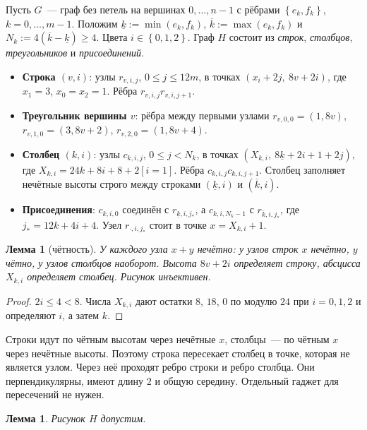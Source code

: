 \documentclass[a4paper,11pt]{article}
\theoremstyle{plain}
\newtheorem{lemma}[theorem]{Лемма}
\theoremstyle{definition}
\theoremstyle{remark}
\newcommand{\set}[1]{\left\{ #1 \right\}}
\begin{document}
Пусть $G$~--- граф без петель на вершинах $0,\dots,n-1$ с рёбрами $\set{e_k,f_k}$, $k=0,\dots,m-1$. Положим $\underline k:=\min(e_k,f_k)$, $\overline k:=\max(e_k,f_k)$ и $N_k:=4(\overline k-\underline k)\ge4$. Цвета $i\in\set{0,1,2}$. Граф $H$ состоит из \emph{строк}, \emph{столбцов}, \emph{треугольников} и \emph{присоединений}.

\begin{itemize}
    \item \textbf{Строка $(v,i)$}: узлы $r_{v,i,j}$, $0\le j\le12m$, в точках $(x_i+2j,\ 8v+2i)$, где $x_1=3$, $x_0=x_2=1$. Рёбра $r_{v,i,j}r_{v,i,j+1}$.
    \item \textbf{Треугольник вершины $v$}: рёбра между первыми узлами $r_{v,0,0}=(1,8v)$, $r_{v,1,0}=(3,8v+2)$, $r_{v,2,0}=(1,8v+4)$.
    \item \textbf{Столбец $(k,i)$}: узлы $c_{k,i,j}$, $0\le j<N_k$, в точках $(X_{k,i},\ 8\underline k+2i+1+2j)$, где $X_{k,i}=24k+8i+8+2[i=1]$. Рёбра $c_{k,i,j}c_{k,i,j+1}$. Столбец заполняет нечётные высоты строго между строками $(\underline k,i)$ и $(\overline k,i)$.
    \item \textbf{Присоединения}: $c_{k,i,0}$ соединён с $r_{\underline k,i,j_*}$, а $c_{k,i,N_k-1}$ с $r_{\overline k,i,j_*}$, где $j_*=12k+4i+4$. Узел $r_{\cdot,i,j_*}$ стоит в точке $x=X_{k,i}+1$.
\end{itemize}

\begin{lemma}[чётность]\label{lem:parity}
    У каждого узла $x+y$ нечётно: у узлов строк $x$ нечётно, $y$ чётно, у узлов столбцов наоборот. Высота $8v+2i$ определяет строку, абсцисса $X_{k,i}$ определяет столбец. Рисунок инъективен.
\end{lemma}

\begin{proof}
    $2i\le4<8$. Числа $X_{k,i}$ дают остатки $8$, $18$, $0$ по модулю $24$ при $i=0,1,2$ и определяют $i$, а затем $k$.
\end{proof}

Строки идут по чётным высотам через нечётные $x$, столбцы~--- по чётным $x$ через нечётные высоты. Поэтому строка пересекает столбец в точке, которая не является узлом. Через неё проходят ребро строки и ребро столбца. Они перпендикулярны, имеют длину $2$ и общую середину. Отдельный гаджет для пересечений не нужен.

\begin{lemma}\label{lem:drawing}
    Рисунок $H$ допустим.
\end{lemma}
\end{document}
